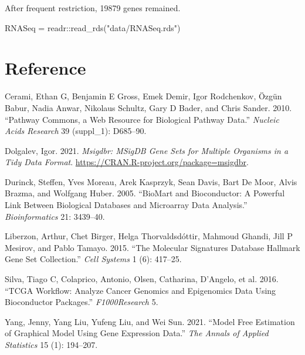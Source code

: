\documentclass[
]{book}
\newenvironment{Shaded}{\begin{snugshade}}{\end{snugshade}}
\newcommand{\FunctionTok}[1]{\textcolor[rgb]{0.00,0.00,0.00}{#1}}
\newcommand{\NormalTok}[1]{#1}
\newcommand{\OtherTok}[1]{\textcolor[rgb]{0.56,0.35,0.01}{#1}}
\newcommand{\SpecialCharTok}[1]{\textcolor[rgb]{0.00,0.00,0.00}{#1}}
\newcommand{\StringTok}[1]{\textcolor[rgb]{0.31,0.60,0.02}{#1}}
\newlength{\cslhangindent}
\newlength{\cslentryspacingunit} %
\newenvironment{CSLReferences}[2] %
 {%
  \setlength{\parindent}{0pt}
  \ifodd #1
  \let\oldpar\par
  \def\par{\hangindent=\cslhangindent\oldpar}
  \fi
  \setlength{\parskip}{#2\cslentryspacingunit}
 }%
 {}
\begin{document}
After frequent restriction, 19879 genes remained.

\begin{Shaded}
\begin{Highlighting}[]
\NormalTok{RNASeq }\OtherTok{=}\NormalTok{ readr}\SpecialCharTok{::}\FunctionTok{read\_rds}\NormalTok{(}\StringTok{"data/RNASeq.rds"}\NormalTok{)  }
\end{Highlighting}
\end{Shaded}

\hypertarget{reference}{%
\chapter*{Reference}\label{reference}}

\hypertarget{refs}{}
\begin{CSLReferences}{1}{0}
\leavevmode{}%
Cerami, Ethan G, Benjamin E Gross, Emek Demir, Igor Rodchenkov, Özgün Babur, Nadia Anwar, Nikolaus Schultz, Gary D Bader, and Chris Sander. 2010. {``Pathway Commons, a Web Resource for Biological Pathway Data.''} \emph{Nucleic Acids Research} 39 (suppl\_1): D685--90.

\leavevmode{}%
Dolgalev, Igor. 2021. \emph{Msigdbr: MSigDB Gene Sets for Multiple Organisms in a Tidy Data Format}. \url{https://CRAN.R-project.org/package=msigdbr}.

\leavevmode{}%
Durinck, Steffen, Yves Moreau, Arek Kasprzyk, Sean Davis, Bart De Moor, Alvis Brazma, and Wolfgang Huber. 2005. {``BioMart and Bioconductor: A Powerful Link Between Biological Databases and Microarray Data Analysis.''} \emph{Bioinformatics} 21: 3439--40.

\leavevmode{}%
Liberzon, Arthur, Chet Birger, Helga Thorvaldsdóttir, Mahmoud Ghandi, Jill P Mesirov, and Pablo Tamayo. 2015. {``The Molecular Signatures Database Hallmark Gene Set Collection.''} \emph{Cell Systems} 1 (6): 417--25.

\leavevmode{}%
Silva, Tiago C, Colaprico, Antonio, Olsen, Catharina, D'Angelo, et al. 2016. {``TCGA Workflow: Analyze Cancer Genomics and Epigenomics Data Using Bioconductor Packages.''} \emph{F1000Research} 5.

\leavevmode{}%
Yang, Jenny, Yang Liu, Yufeng Liu, and Wei Sun. 2021. {``Model Free Estimation of Graphical Model Using Gene Expression Data.''} \emph{The Annals of Applied Statistics} 15 (1): 194--207.

\end{CSLReferences}
\end{document}
